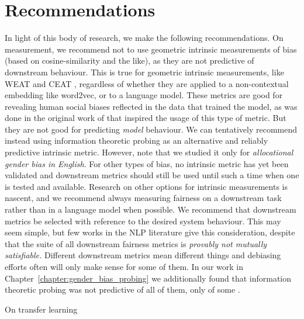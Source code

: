 \section{Recommendations}
In light of this body of research, we make the following recommendations. On measurement, we recommend not to use geometric intrinsic measurements of bias (based on cosine-similarity and the like), as they are not predictive of downstream behaviour. This is true for geometric intrinsic measurements, like WEAT \citep{} and CEAT \citep{}, regardless of whether they are applied to a non-contextual embedding like word2vec, or to a language model. These metrics are good for revealing human social biases reflected in the data that trained the model, as was done in the original work of \citet{Caliskan2017SemanticsDA} that inspired the usage of this type of metric. But they are not good for predicting \textit{model} behaviour. We can tentatively recommend instead using information theoretic probing as an alternative and reliably predictive intrinsic metric. However, note that we studied it only for \textit{allocational gender bias in English}. For other types of bias, no intrinsic metric has yet been validated and downstream metrics should still be used until such a time when one is tested and available. Research on other options for intrinsic measurements is nascent, and we recommend always measuring fairness on a downstream task rather than in a language model when possible.
We recommend that downstream metrics be selected with reference to the desired system behaviour. This may seem simple, but few works in the NLP literature give this consideration, despite that the suite of all downstream fairness metrics is \textit{provably not mutually satisfiable.} Different downstream metrics mean different things  and debiasing efforts often will only make sense for some of them. In our work in Chapter~\ref{chapter:gender_bias_probing} we additionally found that information theoretic probing was not predictive of all of them, only of some .

On transfer learning

